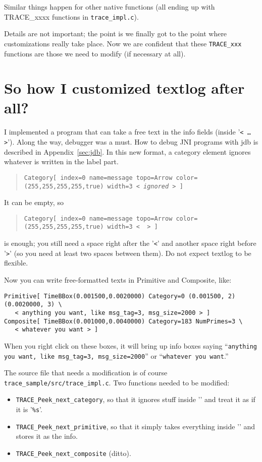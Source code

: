 \documentclass{article}
\begin{document}
Similar things happen for other native functions (all ending up with
TRACE\_xxxx functions in {\tt trace\_impl.c}).

Details are not important; the point is we finally got to the point
where customizations really take place.  Now we are confident that
these {\tt TRACE\_xxx} functions are those we need to modify (if
necessary at all).

\section{So how I customized textlog after all?}
I implemented a program that can take a free text in the info fields (inside '{\tt < \ldots >}').
Along the way, debugger was a must. How to debug JNI programs with jdb
is described in Appendix~\ref{sec:jdb}.
In this new format, a category element ignores whatever is written in the label part.

\begin{quote}
{\tt Category[ index=0 name=message topo=Arrow color=(255,255,255,255,true) width=3 < {\it ignored} > ]}
\end{quote}
It can be empty, so 
\begin{quote}
\begin{verbatim}
Category[ index=0 name=message topo=Arrow color=(255,255,255,255,true) width=3 <  > ]
\end{verbatim}
\end{quote}
is enough; you still need a space right after the '{\tt <}' and another space right before '{\tt >}' (so you need
at least two spaces between them).   Do not expect
textlog to be flexible.  

Now you can write free-formatted texts in Primitive and Composite, like:

\begin{verbatim}
Primitive[ TimeBBox(0.001500,0.0020000) Category=0 (0.001500, 2) (0.0020000, 3) \
   < anything you want, like msg_tag=3, msg_size=2000 > ]
Composite[ TimeBBox(0.001000,0.0040000) Category=183 NumPrimes=3 \
   < whatever you want > ]
\end{verbatim}
When you right click on these boxes, it will bring up info boxes saying 
``{\tt anything you want, like msg\_tag=3, msg\_size=2000}'' or 
``{\tt whatever you want}.''

The source file that needs a modification is of course
{\tt trace\_sample/src/trace\_impl.c}.
Two functions needed to be modified:

\begin{itemize}
\item {\tt TRACE\_Peek\_next\_category}, so that it ignores stuff inside '{\tt <  >}' and treat
it as if it is '{\tt \%s}'.
\item {\tt TRACE\_Peek\_next\_primitive}, so that it simply takes everything inside
'{\tt <  >}' and stores it as the info.
\item {\tt TRACE\_Peek\_next\_composite} (ditto).
\end{itemize}
\end{document}

